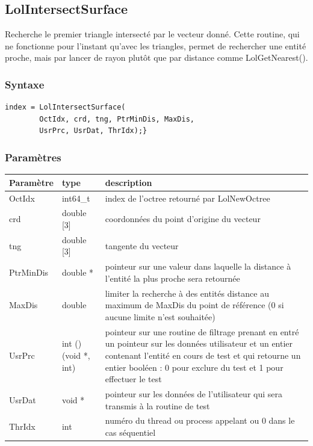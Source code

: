 \documentclass[a4paper,12pt]{article}
\begin{document}
\subsection{LolIntersectSurface}
Recherche le premier triangle intersecté par le vecteur donné. Cette routine, qui ne fonctionne pour l'instant qu'avec les triangles, permet de rechercher une entité proche, mais par lancer de rayon plutôt que par distance comme LolGetNearest().

\subsubsection*{Syntaxe}
\begin{tt}
\begin{verbatim}
index = LolIntersectSurface(
        OctIdx, crd, tng, PtrMinDis, MaxDis,
        UsrPrc, UsrDat, ThrIdx);}
\end{verbatim}
\end{tt}
\normalfont

\subsubsection*{Paramètres}
\begin{tabular}{|m{3cm}|m{2cm}|m{8.5cm}|}
\hline
Paramètre  & type       & description \\
\hline
OctIdx     & int64\_t   & index de l'octree retourné par LolNewOctree \\
\hline
crd        & double [3] & coordonnées du point d'origine du vecteur \\
\hline
tng        & double [3] & tangente du vecteur \\
\hline
PtrMinDis  & double *   & pointeur sur une valeur dans laquelle la distance à l'entité la plus proche sera retournée \\
\hline
MaxDis     & double     & limiter la recherche à des entités distance au maximum de MaxDis du point de référence (0 si aucune limite n'est souhaitée) \\
\hline
UsrPrc     & int ()(void *, int) & pointeur sur une routine de filtrage prenant en entré un pointeur sur les données utilisateur et un entier contenant l'entité en cours de test et qui retourne un entier booléen : 0 pour exclure du test et 1 pour effectuer le test \\
\hline
UsrDat     & void *    & pointeur sur les données de l'utilisateur qui sera transmis à la routine de test \\
\hline
ThrIdx     & int       & numéro du thread ou process appelant ou 0 dans le cas séquentiel \\
\hline
\end{tabular}
\end{document}

